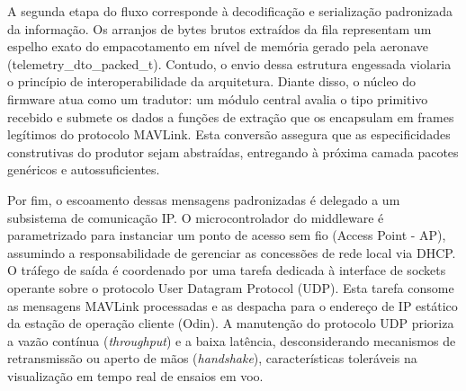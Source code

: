A segunda etapa do fluxo corresponde à decodificação e serialização padronizada da informação. Os arranjos de bytes brutos extraídos da fila representam um espelho exato do empacotamento em nível de memória gerado pela aeronave (telemetry\_dto\_packed\_t). Contudo, o envio dessa estrutura engessada violaria o princípio de interoperabilidade da arquitetura. Diante disso, o núcleo do firmware atua como um tradutor: um módulo central avalia o tipo primitivo recebido e submete os dados a funções de extração que os encapsulam em frames legítimos do protocolo MAVLink. Esta conversão assegura que as especificidades construtivas do produtor sejam abstraídas, entregando à próxima camada pacotes genéricos e autossuficientes.

Por fim, o escoamento dessas mensagens padronizadas é delegado a um subsistema de comunicação IP. O microcontrolador do middleware é parametrizado para instanciar um ponto de acesso sem fio (Access Point - AP), assumindo a responsabilidade de gerenciar as concessões de rede local via DHCP. O tráfego de saída é coordenado por uma tarefa dedicada à interface de sockets operante sobre o protocolo User Datagram Protocol (UDP). Esta tarefa consome as mensagens MAVLink processadas e as despacha para o endereço de IP estático da estação de operação cliente (Odin). A manutenção do protocolo UDP prioriza a vazão contínua (\textit{throughput}) e a baixa latência, desconsiderando mecanismos de retransmissão ou aperto de mãos (\textit{handshake}), características toleráveis na visualização em tempo real de ensaios em voo.
